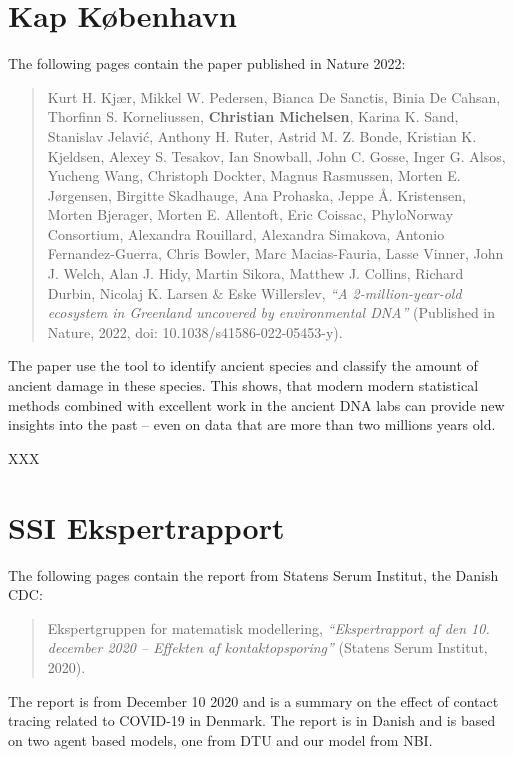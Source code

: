 
\chapter{Kap København}
\label{appendix:kapk}

The following pages contain the paper published in Nature 2022:

\begin{quote}
    Kurt H. Kjær, Mikkel W. Pedersen, Bianca De Sanctis, Binia De Cahsan, Thorfinn S. Korneliussen, \textbf{Christian Michelsen}, Karina K. Sand, Stanislav Jelavić, Anthony H. Ruter, Astrid M. Z. Bonde, Kristian K. Kjeldsen, Alexey S. Tesakov, Ian Snowball, John C. Gosse, Inger G. Alsos, Yucheng Wang, Christoph Dockter, Magnus Rasmussen, Morten E. Jørgensen, Birgitte Skadhauge, Ana Prohaska, Jeppe Å. Kristensen, Morten Bjerager, Morten E. Allentoft, Eric Coissac, PhyloNorway Consortium, Alexandra Rouillard, Alexandra Simakova, Antonio Fernandez-Guerra, Chris Bowler, Marc Macias-Fauria, Lasse Vinner, John J. Welch, Alan J. Hidy, Martin Sikora, Matthew J. Collins, Richard Durbin, Nicolaj K. Larsen \& Eske Willerslev, \emph{``A 2-million-year-old ecosystem in Greenland uncovered by environmental DNA''} (Published in Nature, 2022, doi: 10.1038/s41586-022-05453-y).
\end{quote}
The paper use the \metaDMG tool to identify ancient species and classify the amount of ancient damage in these species.  This shows, that modern modern statistical methods combined with excellent work in the ancient DNA labs can provide new insights into the past -- even on data that are more than two millions years old.

\clearpage
% 
XXX



\chapter{SSI Ekspertrapport}
\label{appendix:ssi-report}

The following pages contain the report from Statens Serum Institut, the Danish CDC:
\begin{quote}
    Ekspertgruppen for matematisk modellering, \emph{``Ekspertrapport af den 10. december 2020 -- Effekten af kontaktopsporing''} (Statens Serum Institut, 2020).
\end{quote}
The report is from December 10 2020 and is a summary on the effect of contact tracing related to COVID-19 in Denmark. The report is in Danish and is based on two agent based models, one from DTU and our model from NBI.

